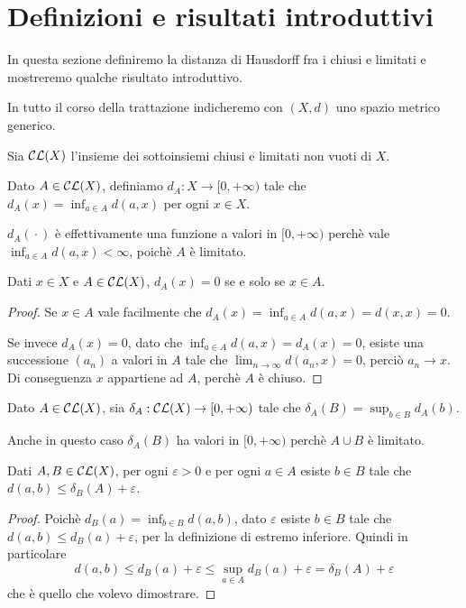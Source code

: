 \section{Definizioni e risultati introduttivi}
In questa sezione definiremo la distanza di Hausdorff fra i chiusi e limitati e mostreremo qualche risultato introduttivo.

In tutto il corso della trattazione indicheremo con $(X,d)$ uno spazio metrico generico.

\begin{definition}
	Sia $\mathcal{CL}(X)$ l'insieme dei sottoinsiemi chiusi e limitati non vuoti di $X$.
\end{definition}

\begin{definition}
	Dato $A\in \mathcal{CL}(X)$, definiamo $d_A: X\to [0,+\infty)$ tale che $d_A(x)=\inf_{a\in A}d(a,x)$ per ogni $x\in X$.
\end{definition}

\begin{remark}
	$d_A({}\cdot{})$ è effettivamente una funzione a valori in $[0,+\infty)$ perchè vale $\inf_{a\in A}d(a,x)<\infty$, poichè $A$ è limitato.
\end{remark}

\begin{lemma}\label{DistanzaChiusoAppartenenza}
	Dati $x\in X$ e $A \in \mathcal{CL}(X)$, $d_A(x)=0$ se e solo se $x\in A$.
\end{lemma}
\begin{proof}
	Se $x\in A$ vale facilmente che $d_A(x)=\inf_{a\in A}d(a,x)=d(x,x)=0$. 

	Se invece $d_A(x)=0$, dato che $\inf_{a\in A}d(a,x)=d_A(x)=0$, esiste una successione $(a_n)$ a valori in $A$ tale che $\lim_{n\to\infty}d(a_n,x)=0$, perciò $a_n\to x$. Di conseguenza $x$ appartiene ad $A$, perchè $A$ è chiuso. 
\end{proof}


\begin{definition}\label{DistanzaAsimmetrica}
	Dato $A\in\mathcal{CL}(X)$, sia $\delta_A:\mathcal{CL}(X)\to [0,+\infty)$ tale che $\delta_A(B)=\sup_{b\in B} d_A(b)$.
\end{definition}
\begin{remark}
	Anche in questo caso $\delta_A(B)$ ha valori in $[0,+\infty)$ perchè $A\cup B$ è limitato.
\end{remark}

\begin{lemma}\label{ApprossimazioneDistanzaAsimmetrica}
	Dati $A,B\in \mathcal{CL}(X)$, per ogni $\varepsilon>0$ e per ogni $a\in A$ esiste $b\in B$ tale che $d(a,b)\le \delta_B(A)+\varepsilon$.
\end{lemma}
\begin{proof}
	Poichè $d_B(a)=\inf_{b\in B}d(a,b)$, dato $\varepsilon$ esiste $b\in B$ tale che $d(a,b)\le d_B(a)+\varepsilon$, per la definizione di estremo inferiore. Quindi in particolare
	\begin{equation*}
		d(a,b)\le d_B(a)+\varepsilon\le \sup_{a\in A}d_B(a)+\varepsilon=\delta_B(A)+\varepsilon
	\end{equation*}
	che è quello che volevo dimostrare.
\end{proof}



